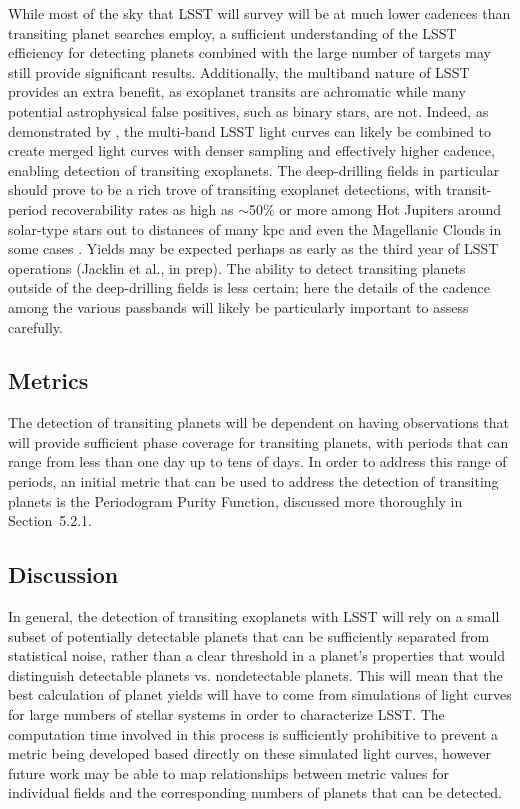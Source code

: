 While most of the sky that LSST will survey will be at much lower
cadences than transiting planet searches employ, a sufficient
understanding of the LSST efficiency for detecting planets combined with
the large number of targets may still provide significant results.
Additionally, the multiband nature of LSST provides an extra benefit, as
exoplanet transits are achromatic while many potential astrophysical
false positives, such as binary stars, are not.
Indeed, as demonstrated by \citet{2015AJ....149...16L}, the multi-band LSST light curves 
can likely be combined to create merged light curves with denser sampling and effectively 
higher cadence, enabling detection of transiting exoplanets. The deep-drilling fields in
particular should prove to be a rich trove of transiting exoplanet detections, with 
transit-period recoverability rates as high as $\sim$50\% or more among Hot Jupiters around 
solar-type stars out to distances of many kpc and even the Magellanic Clouds in some cases 
\citep{2015AJ....149...16L,2015AJ....150...34J}.
Yields may be expected perhaps as early as the third year of LSST operations 
(Jacklin et al., in prep).
The ability to detect transiting planets outside of the deep-drilling fields is less certain;
here the details of the cadence among the various passbands will likely be particularly
important to assess carefully.


\subsection{Metrics}
\label{sec:\secname:metrics}
The detection of transiting planets will be dependent on having observations
that will provide sufficient phase coverage for transiting planets, with periods
that can range from less than one day up to tens of days. In order to address
this range of periods, an initial metric that can be used to address the detection
of transiting planets is the Periodogram Purity Function, discussed more thoroughly
in Section~5.2.1.

\subsection{Discussion}
\label{sec:\secname:discussion}
In general, the detection of transiting exoplanets with LSST will rely on
a small subset of potentially detectable planets that can be sufficiently
separated from statistical noise, rather than a clear threshold in a planet's
properties that would distinguish detectable planets vs. nondetectable planets.
This will mean that the best calculation of planet yields will have to come
from simulations of light curves for large numbers of stellar systems in order
to characterize LSST. The computation time involved in this process is sufficiently
prohibitive to prevent a metric being developed based directly on these
simulated light curves, however future work may be able to map relationships
between metric values for individual fields and the corresponding numbers
of planets that can be detected.

